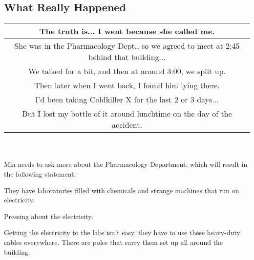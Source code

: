 \subsection{What Really Happened}
\begin{tabular}{c}
The truth is... I went because she called me.\\\hline
She was in the Pharmacology Dept., so we agreed to meet at 2:45 behind that building...\\\hline
We talked for a bit, and then at around 3:00, we split up. \\\hline
Then later when I went back, I found him lying there. \\\hline
I'd been taking Coldkiller X for the last 2 or 3 days...\\\hline
But I lost my bottle of it around lunchtime on the day of the accident. \\\hline
\end{tabular}\\\\
Mia needs to ask more about the Pharmacology Department, which will result in the following statement:\\
\begin{center}
They have laboratories filled with chemicals and strange machines that run on electricity.
\end{center}
Pressing about the electricity,
\begin{center}
Getting the electricity to the labs isn't easy, they have to use these heavy-duty cables everywhere. There are poles that carry them set up all around the building.
\end{center}


